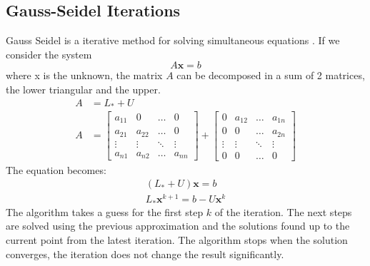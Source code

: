 \documentclass[12pt,a4paper,twoside]{report}
\begin{document}
{\subsection{Gauss-Seidel Iterations} \label{GaussSeidel}
Gauss Seidel is a iterative method for solving simultaneous equations \cite{golub2012matrix}. If we consider the system 
\begin{equation}
A\boldsymbol{x} = b
\end{equation}
where x is the unknown, the matrix $A$ can be decomposed in a sum of 2 matrices, the lower triangular and the upper.
\begin{equation}
	\begin{split}
	A &= L_* +U \\
	A &= \begin{bmatrix}
	a_{11} &  0  & \ldots & 0\\
	a_{21} &  a_{22} & \ldots & 0\\
	\vdots & \vdots & \ddots & \vdots\\
	a_{n1} &  a_{n2}       &\ldots & a_{nn}
	\end{bmatrix}  
	+  \begin{bmatrix}
	0 &  a_{12}  & \ldots & a_{1n}\\
	0 &  0 & \ldots &a_{2n}\\
	\vdots & \vdots & \ddots & \vdots\\
	0 &  0  &\ldots & 0
	\end{bmatrix} 
 	\end{split}
\end{equation}
	The equation becomes:
\begin{equation}
\begin{split}
	(L_*+U)\boldsymbol{x} = b\\
	L_*\boldsymbol{x}^{k+1} = b - U\boldsymbol{x}^{k}
\end{split}
\end{equation}
The algorithm takes a guess for the first step  $k$ of the iteration. The next steps are solved using the previous approximation and the solutions found up to the current point from the latest iteration. The algorithm stops when the solution converges, the iteration does not change the result significantly.

}
\end{document}
